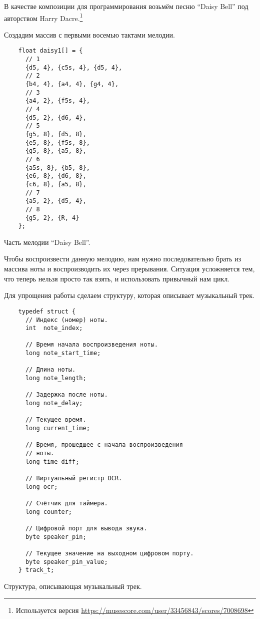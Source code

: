 \documentclass[../sparc.tex]{subfiles}
\begin{document}
В качестве композиции для программирования возьмём песню ``Daisy Bell'' под
авторством Harry Dacre.\footnote{Используется версия
\url{https://musescore.com/user/33456843/scores/7008698}}

Создадим массив с первыми восемью тактами мелодии.

\begin{listing}[H]
  \begin{verbatim}
    float daisy1[] = {
      // 1
      {d5, 4}, {c5s, 4}, {d5, 4},
      // 2
      {b4, 4}, {a4, 4}, {g4, 4},
      // 3
      {a4, 2}, {f5s, 4},
      // 4
      {d5, 2}, {d6, 4},
      // 5
      {g5, 8}, {d5, 8},
      {e5, 8}, {f5s, 8},
      {g5, 8}, {a5, 8},
      // 6
      {a5s, 8}, {b5, 8},
      {e6, 8}, {d6, 8},
      {c6, 8}, {a5, 8},
      // 7
      {a5, 2}, {d5, 4},
      // 8
      {g5, 2}, {R, 4}
    };
  \end{verbatim}
  \caption{Часть мелодии ``Daisy Bell''.}
  \label{listing:mcu-music-2}
\end{listing}

Чтобы воспроизвести данную мелодию, нам нужно последовательно брать из массива
ноты и воспроизводить их через прерывания.  Ситуация усложняется тем, что теперь
нельзя просто так взять, и использовать привычный нам цикл.

Для упрощения работы сделаем структуру, которая описывает музыкальный трек.

\begin{listing}[H]
  \begin{verbatim}
    typedef struct {
      // Индекс (номер) ноты.
      int  note_index;

      // Время начала воспроизведения ноты.
      long note_start_time;

      // Длина ноты.
      long note_length;

      // Задержка после ноты.
      long note_delay;

      // Текущее время.
      long current_time;

      // Время, прошедшее с начала воспроизведения
      // ноты.
      long time_diff;

      // Виртуальный регистр OCR.
      long ocr;

      // Счётчик для таймера.
      long counter;

      // Цифровой порт для вывода звука.
      byte speaker_pin;

      // Текущее значение на выходном цифровом порту.
      byte speaker_pin_value;
    } track_t;
  \end{verbatim}
  \caption{Структура, описывающая музыкальный трек.}
  \label{listing:mcu-music-3}
\end{listing}
\end{document}
